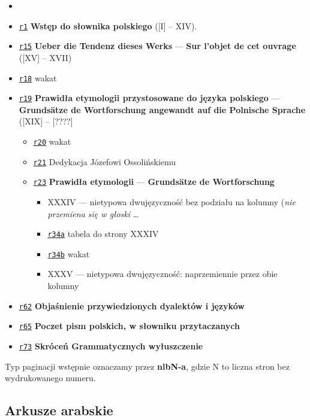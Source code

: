 \documentclass[12]{mwart}
\begin{document}
\begin{itemize}
\item \item \href{\pai{1}{57}}{\texttt{r1}} \textbf{Wstęp do słownika
    polskiego} ([I] -- XIV).
\item \href{\pai{1}{71}}{\texttt{r15}} \textbf{Ueber die Tendenz dieses
    Werks} --- \textbf{Sur l'objet de cet ouvrage} ([XV] -- XVII)
\item \href{\pai{1}{74}}{\texttt{r18}} wakat
\item \href{\pai{1}{75}}{\texttt{r19}} \textbf{Prawidła etymologii
    przystosowane do języka polskiego} --- \textbf{Grundsätze de
    Wortforschung angewandt auf die Polnische Sprache} ([XIX] -- [????]
  \begin{itemize}
  \item \href{\pai{1}{76}}{\texttt{r20}} wakat
  \item \href{\pai{1}{77}}{\texttt{r21}} Dedykacja Józefowi Ossolińskiemu
  \item \href{\pai{1}{79}}{\texttt{r23}} \textbf{Prawidła etymologii} --- \textbf{Grundsätze de
    Wortforschung}
    \begin{itemize}
    \item XXXIV --- nietypowa dwujęzyczność bez podziału na kolumny
      (\textit{nie przemiena się w głoski} \ldots
    \item \href{\pai{1}{91}}{\texttt{r34a}} tabela do strony XXXIV
    \item \href{\pai{1}{92}}{\texttt{r34b}} wakat
    \item XXXV --- nietypowa dwujęzyczność: naprzemiennie przez obie kolumny
    \end{itemize}
  \end{itemize}
\item \href{\pai{1}{120}}{\texttt{r62}} \textbf{Objaśnienie przywiedzionych dyalektów i języków}
\item \href{\pai{1}{123}}{\texttt{r65}} \textbf{Poczet pism polskich, w słowniku przytaczanych}
\item \href{\pai{1}{131}}{\texttt{r73}} \textbf{Skróceń Grammatycznych wyłuszczenie}
\end{itemize}

Typ paginacji wstępnie oznaczamy przez \textbf{nlbN-a}, gdzie N to
liczna stron bez wydrukowanego numeru.


\subsection{Arkusze arabskie}
\label{sec:arkusze-arabskie}
\end{document}
